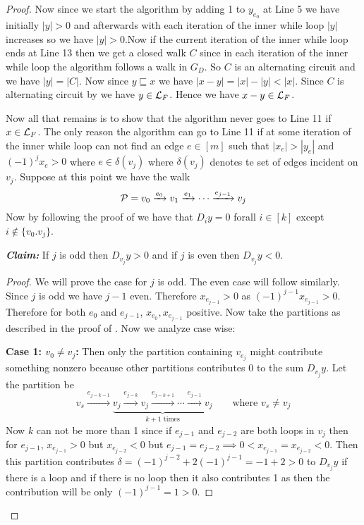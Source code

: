 \begin{proof}
Now since we start the algorithm by adding 1 to $y_{e_0}$ at Line 5 we have initially $|y|>0$ and afterwards with each iteration of the inner while loop $|y|$ increases so we have $|y|>0$.Now if the current iteration of the inner while loop ends at Line 13 then we get a closed walk $C$ since in each iteration of the inner while loop the algorithm follows a walk in $G_D$. So $C$ is an alternating circuit and  we have $|y|=|C|$. Now since $y\sqsubseteq x$ we have $|x-y|=|x|-|y|<|x|$. Since $C$ is alternating circuit by  we have $y\in \mathcal{L}_F$. Hence we have $x-y\in\mathcal{L}_F$.

Now all that remains is to show that the algorithm never goes to Line 11 if $x\in\mathcal{L}_F$. The only reason the algorithm can go to Line 11 if at some iteration of the inner while loop can not find an edge $e\in [m]$ such that $|x_e|>|y_e|$ and $(-1)^jx_e>0$ where $e\in \delta(v_j)$ where $\delta(v_j)$ denotes te set of edges incident on $v_j$. Suppose at this point we have the walk $$\mathcal{P}=v_0\xrightarrow{e_0}v_1\xrightarrow{e_1}\cdots \xrightarrow{e_{j-1}}v_j$$Now by following the proof of  we have that $D_iy=0$ forall $i\in[k]$ except $i\notin \{v_0.v_j\}$.\parinf \vspace*{5mm}

\textbf{\textit{Claim:}} If $j$ is odd then $D_{v_j}y>0$ and if $j$ is even then $D_{v_j}y<0$.

\begin{proof} We will prove the case for $j$ is odd. The even case will follow similarly. Since $j$ is odd we have $j-1$ even. Therefore $x_{e_{j-1}}>0$ as $(-1)^{j-1}x_{e_{j-1}}>0$. Therefore for both $e_0$ and $e_{j-1}$, $x_{e_0},x_{e_{j-1}}$ positive. Now take the partitions as described in the proof of . Now we analyze case wise:\parinf

\textbf{Case 1: $v_0\neq v_j$:} Then only the partition containing $v_{e_j}$ might contribute something nonzero because other partitions contributes 0 to the sum $D_{v_j}y$. Let the partition be $$v_s\xrightarrow{e_{j-k-1}}\underbrace{v_j \xrightarrow{e_{j-k}}v_j\xrightarrow{e_{j-k+1}}\cdots \xrightarrow{e_{j-1}}v_j}_{k+1\text{ times}}\qquad \text{where $v_s\neq v_{j}$}$$Now $k$ can not be more than 1 since if $e_{j-1}$ and $e_{j-2}$ are both loops in $v_j$ then for $e_{j-1}$, $x_{e_{j-1}}>0$ but $x_{e_{j-2}}<0$ but  $e_{j-1}=e_{j-2}\implies 0<x_{e_{j-1}}=x_{e_{j-2}}<0$. Then this partition contributes $\delta=(-1)^{j-2}+2(-1)^{j-1}=-1+2>0$ to $D_{v_j}y$ if there is a loop and if there is no loop then it also contributes 1 as then the contribution will be only $(-1)^{j-1}=1>0$.


\end{proof}
\end{proof}
